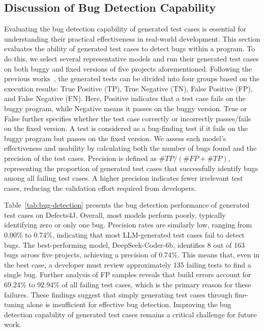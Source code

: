 \subsection{Discussion of Bug Detection Capability}
\label{sec:discussion_fault}
Evaluating the bug detection capability of generated test cases is essential for understanding their practical effectiveness in real-world development. This section evaluates the ability of generated test cases to detect bugs within a program.
To do this, we select several representative models and run their generated test cases on both buggy and fixed versions of five projects aforementioned. Following the previous works~\cite{dinella_toga_2022, hossain_togll_2024, liu_more_2023a, hossain_neuralbased_2023a}, the generated tests can be divided into four groups based on the execution results: True Positive (TP), True Negative (TN), False Positive (FP), and False Negative (FN). Here, Positive indicates that a test case fails on the buggy program, while Negative means it passes on the buggy version. True or False further specifies whether the test case correctly or incorrectly passes/fails on the fixed version.
A test is considered as a bug-finding test if it fails on the buggy program but passes on the fixed version.
We assess each model’s effectiveness and usability by calculating both the number of bugs found and the precision of the test cases. Precision is defined as $\#TP/(\#FP + \#TP)$, representing the proportion of generated test cases that successfully identify bugs among all failing test cases. A higher precision indicates fewer irrelevant test cases, reducing the validation effort required from developers.



Table~\ref{tab:bug-detection} presents the bug detection performance of generated test cases on Defects4J. Overall, most models perform poorly, typically identifying zero or only one bug. Precision rates are similarly low, ranging from 0.00\% to 0.74\%, indicating that most LLM-generated test cases fail to detect bugs. The best-performing model, DeepSeek-Coder-6b, identifies 8 out of 163 bugs across five projects, achieving a precision of 0.74\%. This means that, even in the best case, a developer must review approximately 135 failing tests to find a single bug.
Further analysis of FP samples reveals that build errors account for 69.24\% to 92.94\% of all failing test cases, which is the primary reason for these failures. These findings suggest that simply generating test cases through fine-tuning alone is insufficient for effective bug detection. Improving the bug detection capability of generated test cases remains a critical challenge for future work.

